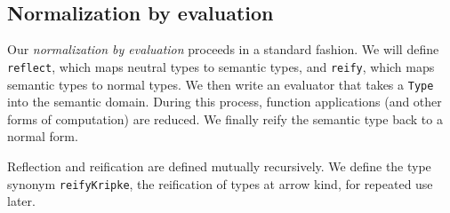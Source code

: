 \documentclass[authoryear, acmsmall, screen, review, nonacm]{acmart}
\begin{document}
\begin{code}[hide]
\AgdaSymbol{=}\AgdaSpace{}%
\AgdaOperator{\AgdaInductiveConstructor{R[}}\AgdaSpace{}%
\AgdaSpace{}%
\AgdaOperator{\AgdaInductiveConstructor{]}}\AgdaSymbol{\}}\AgdaSpace{}%
\AgdaSpace{}%
\AgdaSpace{}%
\AgdaSymbol{=}\AgdaSpace{}%
\<%
\\
%
\\[\AgdaEmptyExtraSkip]%
\>[0]\AgdaSpace{}%
\AgdaSymbol{\{}\AgdaSymbol{\}}\AgdaSpace{}%
\AgdaSymbol{\{}\AgdaSymbol{\}}\AgdaSpace{}%
\AgdaSpace{}%
\AgdaSymbol{=}\AgdaSpace{}%
\AgdaSpace{}%
\AgdaSymbol{\{}\AgdaSpace{}%
\AgdaSymbol{=}\AgdaSpace{}%
\AgdaSymbol{\}}\AgdaSpace{}%
\AgdaSymbol{\{}\AgdaSpace{}%
\AgdaSymbol{=}\AgdaSpace{}%
\AgdaSymbol{\}}\AgdaSpace{}%
\AgdaSpace{}%
\<%
\end{code}

\subsection{Normalization by evaluation}

Our \emph{normalization by evaluation} proceeds in a standard fashion. We will define \verb!reflect!, which maps neutral types to semantic types, and \verb!reify!, which maps semantic types to normal types. We then write an evaluator that takes a \verb!Type! into the semantic domain. During this process, function applications (and other forms of computation) are reduced. We finally reify the semantic type back to a normal form.

Reflection and reification are defined mutually recursively. We define the type synonym \verb!reifyKripke!, the reification of types at arrow kind, for repeated use later.
\end{document}
